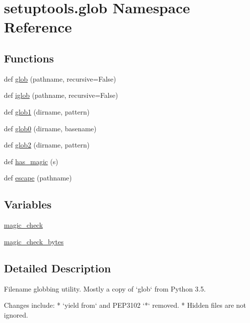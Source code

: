 \hypertarget{namespacesetuptools_1_1glob}{}\section{setuptools.\+glob Namespace Reference}
\label{namespacesetuptools_1_1glob}
\subsection*{Functions}
\begin{DoxyCompactItemize}
\item 
def \hyperlink{namespacesetuptools_1_1glob_aaa3481017d8575f370da9768113e795f}{glob} (pathname, recursive=False)
\item 
def \hyperlink{namespacesetuptools_1_1glob_a785709f6dd54bc19304bb581cc6e7707}{iglob} (pathname, recursive=False)
\item 
def \hyperlink{namespacesetuptools_1_1glob_a44ead1132e5a984ad1edd86a4b643141}{glob1} (dirname, pattern)
\item 
def \hyperlink{namespacesetuptools_1_1glob_a75dda51129cf0b110589765487cb12dd}{glob0} (dirname, basename)
\item 
def \hyperlink{namespacesetuptools_1_1glob_a314c02b7732b13b3a0c129a7282b55ef}{glob2} (dirname, pattern)
\item 
def \hyperlink{namespacesetuptools_1_1glob_aab80b9560e1118922c32b88a7b758288}{has\+\_\+magic} (s)
\item 
def \hyperlink{namespacesetuptools_1_1glob_a73ffea4dfe02e8a0294dad20dbb55a0a}{escape} (pathname)
\end{DoxyCompactItemize}
\subsection*{Variables}
\begin{DoxyCompactItemize}
\item 
\hyperlink{namespacesetuptools_1_1glob_a8b4aa8dfe849c42d139011a8050da833}{magic\+\_\+check}
\item 
\hyperlink{namespacesetuptools_1_1glob_a6004b75354404430fa928ea3dd63792c}{magic\+\_\+check\+\_\+bytes}
\end{DoxyCompactItemize}


\subsection{Detailed Description}
\begin{DoxyVerb}Filename globbing utility. Mostly a copy of `glob` from Python 3.5.

Changes include:
 * `yield from` and PEP3102 `*` removed.
 * Hidden files are not ignored.
\end{DoxyVerb}
 

